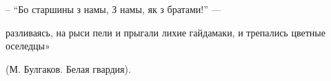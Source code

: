  
 
 
 
 


– \enquote{Бо старшины з намы, З намы, як з братами!} —

разливаясь, на рыси пели и прыгали лихие гайдамаки, и трепались цветные оселедцы»

(М. Булгаков. Белая гвардия).
